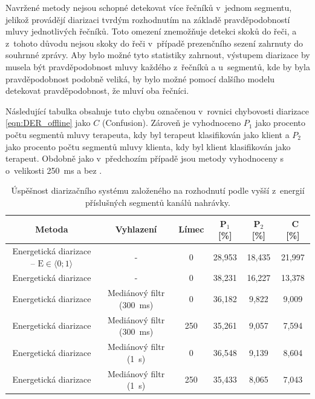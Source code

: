 Navržené metody nejsou schopné detekovat více řečníků v~jednom segmentu, jelikož provádějí diarizaci tvrdým rozhodnutím na základě pravděpodobností mluvy jednotlivých řečníků. Toto omezení znemožňuje detekci skoků do řeči, a z~tohoto důvodu nejsou skoky do řeči v~případě prezenčního sezení zahrnuty do souhrnné zprávy. Aby bylo možné tyto statistiky zahrnout, výstupem diarizace by musela být pravděpodobnost mluvy každého z~řečníků a u~segmentů, kde by byla pravděpodobnost podobně veliká, by bylo možné pomocí dalšího modelu detekovat pravděpodobnost, že mluví oba řečníci. 

Následující tabulka obsahuje tuto chybu označenou v~rovnici chybovosti diarizace \ref{eqn:DER_offline} jako $C$ (Confusion). Zároveň je vyhodnoceno $P_{1}$ jako procento počtu segmentů mluvy terapeuta, kdy byl terapeut klasifikován jako klient a $P_{2}$ jako procento počtu segmentů mluvy klienta, kdy byl klient klasifikován jako terapeut. Obdobně jako v~předchozím případě jsou metody vyhodnoceny s~ o~velikosti 250~ms a bez .


\begin{table}[H]
\begin{adjustbox}{width=\textwidth}
\begin{tabular}{ |c|c|c|c|c|c| } 
    \hline
    \textbf{Metoda} & \textbf{Vyhlazení} & \textbf{Límec} &  $\mathbf{P}_{1}$ [\%]  & $\mathbf{P}_{2}$ [\%] & \ $\mathbf{C}$ [\%] \\
    \hline
    Energetická diarizace -- $\text{E} \in \langle0;1\rangle$ & - & 0  & 28,953 & 18,435 & 21,997 \\
    \hline
    Energetická diarizace & - & 0 &38,231 & 16,227 & 13,378 \\
    \hline
    Energetická diarizace & Mediánový filtr (300~ms) & 0 & 36,182 &  9,822 & 9,009 \\
    \hline
    Energetická diarizace & Mediánový filtr (300~ms) & 250 & 35,261 &  9,057 & 7,594\\
    \hline
    Energetická diarizace & Mediánový filtr (1~s) & 0 & 36,548 & 9,139 & 8,604 \\
    \hline
    Energetická diarizace & Mediánový filtr (1~s) & 250 & 35,433 & 8,065 & 7,043 \\
    \hline
\end{tabular}
\end{adjustbox}
\caption{\label{tab:Diar_energy_deepsy} Úspěšnost diarizačního systému založeného na rozhodnutí podle vyšší z~energií příslušných segmentů kanálů nahrávky.}
\end{table}


